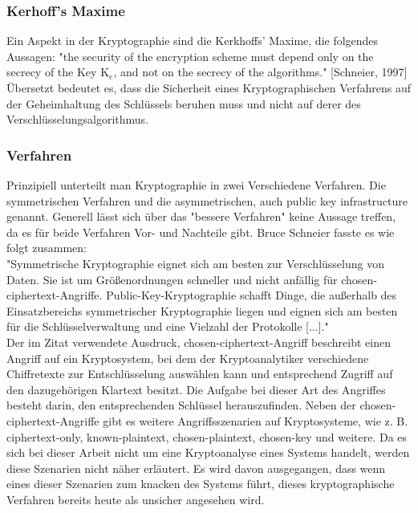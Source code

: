 \documentclass[10pt, a4paper,headsepline]{scrreprt}
\begin{document}
\subsubsection{Kerhoff's Maxime}
Ein Aspekt in der Kryptographie sind die Kerkhoffs' Maxime, die folgendes Aussagen: "the security of the encryption scheme must depend only on the secrecy of the Key K$_{e}$, and not on the secrecy of the algorithms." [Schneier, 1997] Übersetzt bedeutet es, dass die Sicherheit eines Kryptographischen Verfahrens  auf der Geheimhaltung des Schlüssels beruhen muss und nicht auf derer des Verschlüsselungsalgorithmus.


\subsubsection{Verfahren}
Prinzipiell unterteilt man Kryptographie in zwei Verschiedene Verfahren. Die symmetrischen Verfahren und die asymmetrischen, auch public key infrastructure genannt. Generell lässt sich über das "bessere Verfahren" keine Aussage treffen, da es für beide Verfahren Vor- und Nachteile gibt. Bruce Schneier fasste es wie folgt zusammen: \\
"Symmetrische Kryptographie eignet sich am besten zur Verschlüsselung von Daten. Sie ist um Größenordnungen schneller und nicht anfällig für chosen-ciphertext-Angriffe. Public-Key-Kryptographie schafft Dinge, die außerhalb des Einsatzbereichs symmetrischer Kryptographie liegen und eignen sich am besten für die Schlüsselverwaltung und eine Vielzahl der Protokolle [...]."\\ %
Der im Zitat verwendete Ausdruck, chosen-ciphertext-Angriff beschreibt einen Angriff auf ein Kryptosystem, bei dem der Kryptoanalytiker verschiedene Chiffretexte zur Entschlüsselung auswählen kann und entsprechend Zugriff auf den dazugehörigen Klartext besitzt. Die Aufgabe bei dieser Art des Angriffes besteht darin, den entsprechenden Schlüssel herauszufinden. %
Neben der chosen-ciphertext-Angriffe gibt es weitere Angriffsszenarien auf Kryptosysteme, wie z. B. ciphertext-only, known-plaintext, chosen-plaintext, chosen-key und weitere. Da es sich bei dieser Arbeit nicht um eine Kryptoanalyse eines Systems handelt, werden diese Szenarien nicht näher erläutert. Es wird davon ausgegangen, dass wenn eines dieser Szenarien zum knacken des Systems führt, dieses kryptographische Verfahren bereits heute als unsicher angesehen wird.
\end{document}
